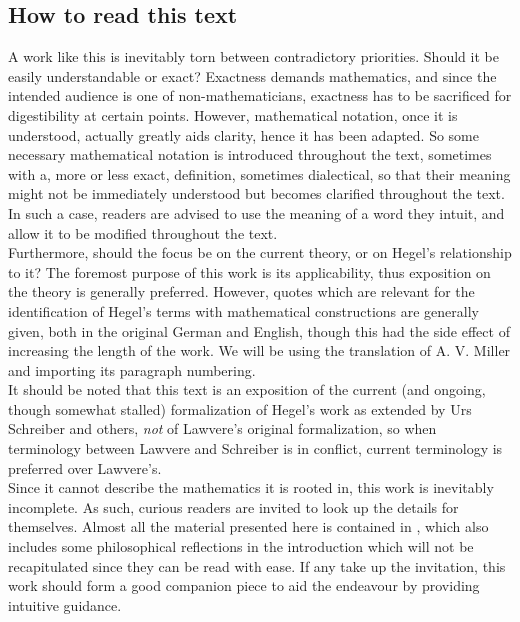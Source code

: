 \documentclass{article}
\begin{document}
\subsection{How to read this text}
A work like this is inevitably torn between contradictory priorities. Should it be easily understandable
or exact? Exactness demands mathematics, and since the intended audience is one of non-mathematicians,
exactness has to be sacrificed for digestibility at certain points. However, mathematical notation, once
it is understood, actually greatly aids clarity, hence it has been adapted. So some necessary mathematical
notation is introduced throughout the text, sometimes with a, more or less exact, definition, sometimes
dialectical, so that their meaning might not be immediately understood but becomes clarified throughout
the text. In such a case, readers are advised to use the meaning of a word they intuit, and allow it to
be modified throughout the text. \\

Furthermore, should the focus be on the current theory, or on Hegel's relationship to it? The foremost
purpose of this work is its applicability, thus exposition on the theory is generally preferred. However,
quotes which are relevant for the identification of Hegel's terms with mathematical constructions are
generally given, both in the original German and English, though this had the side effect of increasing
the length of the work. We will be using the translation of A. V. Miller and importing its paragraph numbering.
\\

It should be noted that this text is an exposition of the current (and ongoing, though somewhat stalled)
formalization of Hegel's work as extended by Urs Schreiber and others, \emph{not} of Lawvere's original
formalization, so when terminology between Lawvere and Schreiber is in conflict, current terminology is
preferred over Lawvere's. \\

Since it cannot describe the mathematics it is rooted in, this work is inevitably incomplete. As such,
 curious readers are invited to look up the details for themselves. Almost all the material presented
here is contained in \cite{nlabsol}, which also includes some philosophical reflections
in the introduction which will not be recapitulated since they can be read with ease. If any take up the
invitation, this work should form a good companion piece to aid the endeavour by providing intuitive guidance.
\end{document}
